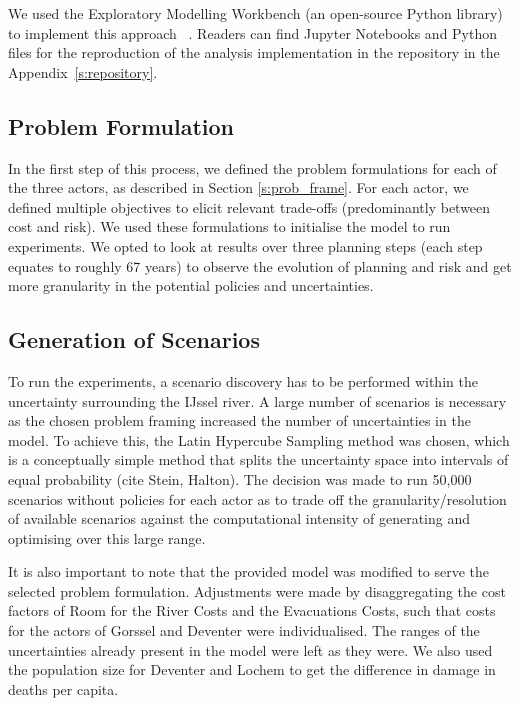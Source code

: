 We used the Exploratory Modelling Workbench (an open-source Python library) to implement this approach ~\parencite{kwakkel_exploratory_2017}. Readers can find Jupyter Notebooks and Python files for the reproduction of the analysis implementation in the repository in the Appendix~\ref{s:repository}.

\subsection{Problem Formulation}
In the first step of this process, we defined the problem formulations for each of the three actors, as described in Section \ref{s:prob_frame}. For each actor, we defined multiple objectives to elicit relevant trade-offs (predominantly between cost and risk). We used these formulations to initialise the model to run experiments. We opted to look at results over three planning steps (each step equates to roughly 67 years) to observe the evolution of planning and risk and get more granularity in the potential policies and uncertainties.

\subsection{Generation of Scenarios}
To run the experiments, a scenario discovery has to be performed within the uncertainty surrounding the IJssel river. A large number of scenarios is necessary as the chosen problem framing increased the number of uncertainties in the model. To achieve this, the Latin Hypercube Sampling method was chosen, which is a conceptually simple method that splits the uncertainty space into intervals of equal probability (cite Stein, Halton). The decision was made to run 50,000 scenarios without policies for each actor as to trade off the granularity/resolution of available scenarios against the computational intensity of generating and optimising over this large range.  

It is also important to note that the provided model was modified to serve the selected problem formulation. Adjustments were made by disaggregating the cost factors of Room for the River Costs and the Evacuations Costs, such that costs for the actors of Gorssel and Deventer were individualised. The ranges of the uncertainties already present in the model were left as they were. We also used the population size for Deventer and Lochem to get the difference in damage in deaths per capita. 


